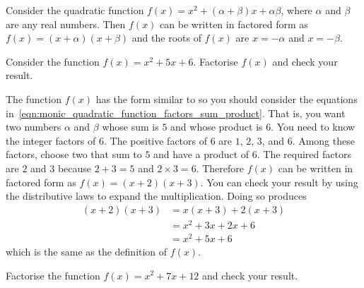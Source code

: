 \documentclass[a4paper,oneside,12pt]{article}
\begin{document}
\begin{theorem}
Consider the quadratic function
$f(x) = x^2 + (\alpha + \beta)x + \alpha\beta$, where $\alpha$ and
$\beta$ are any real numbers.  Then $f(x)$ can be written in factored
form as $f(x) = (x + \alpha) (x + \beta)$ and the roots of $f(x)$ are
$x = -\alpha$ and $x = -\beta$.
\end{theorem}

\begin{example}
\label{eg:factorise_monic_a1_b2_c6}
Consider the function $f(x) = x^2 + 5x + 6$.  Factorise $f(x)$ and
check your result.
\end{example}

\begin{solution}
The function $f(x)$ has the form similar to
 so you should consider the
equations
in~\eqref{eqn:monic_quadratic_function_factors_sum_product}.  That is,
you want two numbers $\alpha$ and $\beta$ whose sum is $5$ and whose
product is $6$.  You need to know the integer factors of $6$.  The
positive factors of $6$ are $1$, $2$, $3$, and $6$.  Among these
factors, choose two that sum to $5$ and have a product of $6$.  The
required factors are $2$ and $3$ because $2 + 3 = 5$ and
$2 \times 3 = 6$.  Therefore $f(x)$ can be written in factored form as
$f(x) = (x + 2) (x + 3)$.  You can check your result by using the
distributive laws to expand the multiplication.  Doing so produces
\begin{align*}
(x + 2) (x + 3)
&=
x(x + 3) + 2(x + 3) \\[4pt]
&=
x^2 + 3x + 2x + 6 \\[4pt]
&=
x^2 + 5x + 6
\end{align*}
which is the same as the definition of $f(x)$.
\end{solution}

\begin{exercise}
Factorise the function $f(x) = x^2 + 7x + 12$ and check your result.
\end{exercise}

\end{document}
